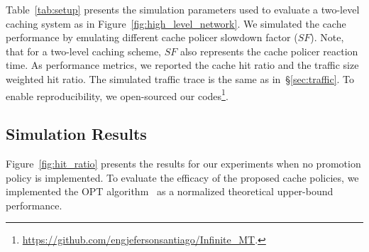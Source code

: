 Table~\ref{tab:setup} presents the simulation parameters used to evaluate a two-level caching system as in Figure~\ref{fig:high_level_network}.
We simulated the cache performance by emulating different cache policer slowdown factor ($SF$).
Note, that for a two-level caching scheme, $SF$ also represents the cache policer reaction time.
As performance metrics, we reported the cache hit ratio and the traffic size weighted hit ratio.
The simulated traffic trace is the same as in~\S\ref{sec:traffic}.
To enable reproducibility, we open-sourced our codes\footnote{\url{https://github.com/engjefersonsantiago/Infinite_MT}.}.


\subsection{Simulation Results}

Figure~\ref{fig:hit_ratio} presents the results for our experiments when no promotion policy is implemented.
To evaluate the efficacy of the proposed cache policies, we implemented the OPT algorithm~\cite{Belady:66} as a normalized theoretical upper-bound performance.

